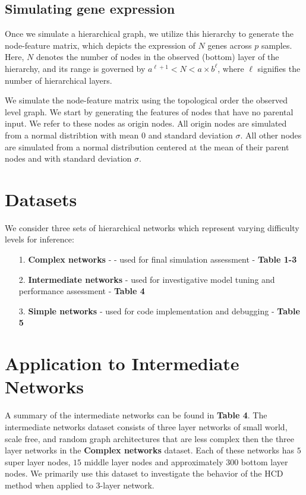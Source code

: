 \documentclass[
]{article}
\begin{document}
\subsection*{Simulating gene expression}

Once we simulate a hierarchical graph, we utilize this hierarchy to
generate the node-feature matrix, which depicts the expression of \(N\)
genes across \(p\) samples. Here, \(N\) denotes the number of nodes in
the observed (bottom) layer of the hierarchy, and its range is governed
by \(a^{\ell+1}<N<a\times b^\ell\), where \(\ell\) signifies the number
of hierarchical layers.

We simulate the node-feature matrix using the topological order the
observed level graph. We start by generating the features of nodes that
have no parental input. We refer to these nodes as origin nodes. All
origin nodes are simulated from a normal distribtion with mean \(0\) and
standard deviation \(\sigma\). All other nodes are simulated from a
normal distribution centered at the mean of their parent nodes and with
standard deviation \(\sigma\).

\section*{Datasets}

We consider three sets of hierarchical networks which represent varying
difficulty levels for inference:

\begin{itemize}
  \item[1.] \textbf{Complex networks} - - used for final simulation assessment - \textbf{Table 1-3}
  \item[2.] \textbf{Intermediate networks} - used for investigative model tuning and performance assessment - \textbf{Table 4}
  \item[3.] \textbf{Simple networks} - used for code implementation and debugging - \textbf{Table 5}
\end{itemize}

\section*{Application to Intermediate Networks}

A summary of the intermediate networks can be found in \textbf{Table 4}.
The intermediate networks dataset consists of three layer networks of
small world, scale free, and random graph architectures that are less
complex then the three layer networks in the \textbf{Complex networks}
dataset. Each of these networks has \(5\) super layer nodes, \(15\)
middle layer nodes and approximately \(300\) bottom layer nodes. We
primarily use this dataset to investigate the behavior of the HCD method
when applied to 3-layer network.
\end{document}
